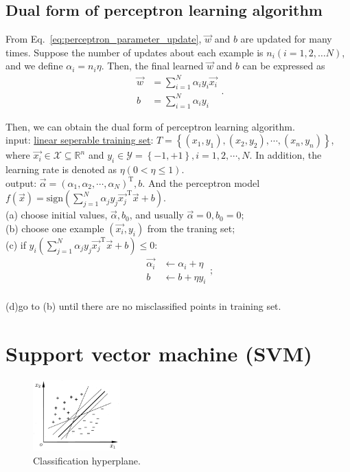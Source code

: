 \documentclass[10pt,onecolumn]{book}
\begin{document}
\subsection{Dual form of perceptron learning algorithm}
From Eq.~\ref{eq:perceptron_parameter_update}, $\vec{w}$ and $b$ are updated for many times. Suppose the number of updates about each example is $n_i (i = 1, 2, \dots N)$, and we define $\alpha_i = n_i \eta$. Then, the final learned $\vec{w}$ and $b$ can be expressed as
\begin{equation}
\begin{split}
	\vec{w} & = \sum_{i = 1}^{N} \alpha_i y_i \vec{x_i} \\
	b 		& = \sum_{i = 1}^{N} \alpha_i y_i
\end{split}.
\end{equation}

Then, we can obtain the dual form of perceptron learning algorithm.\\
\indent	\indent input: \uline{linear seperable training set}: $T = \left\{ (x_1, y_1), (x_2, y_2), \cdots, (x_n ,y_n) \right\}$, where $\vec{x_i} \in \mathcal{X} \subseteq \mathbb{R}^n$ and $y_i \in \mathcal{Y} = \left\{-1, +1\right\}, i = 1, 2, \cdots, N$. In addition, the learning rate is denoted 
as $\eta (0 < \eta \le 1)$. \\
\indent \indent output: $\vec{\alpha} = (\alpha_1, \alpha_2, \cdots, \alpha_N)^\mathrm{T}, b$. And the perceptron model $f(\vec{x}) = \mathrm{sign}(\sum_{j=1}^{N} \alpha_j y_j \vec{x_j}^\mathrm{T} \vec{x} + b )$. \\
\indent \indent (a) choose initial values, $\vec{\alpha}, b_0$, and usually $\vec{\alpha} = 0, b_0 = 0$; \\
\indent \indent (b) choose one example $(\vec{x_i}, y_i)$ from the traning set; \\
\indent \indent (c) if $y_{i} (\sum_{j=1}^{N} \alpha_j y_j \vec{x_j}^\mathrm{T} \vec{x} + b) \le 0$:
\begin{equation}
\begin{split}
\vec{\alpha_i} & \gets \alpha_i + \eta \\
	b & \gets b + \eta y_i
\end{split};
\end{equation} \\
\indent \indent (d)go to (b) until there are no misclassified points in training set.

\section{Support vector machine (SVM)}
\begin{figure}[h]
\centering
\includegraphics[width=0.3\textwidth]{figures/svm.png}
\caption{Classification hyperplane.}
\end{figure}
\end{document}
